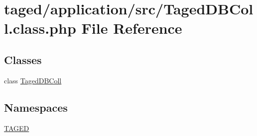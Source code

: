 \hypertarget{_taged_d_b_coll_8class_8php}{}\section{taged/application/src/\+Taged\+D\+B\+Coll.class.\+php File Reference}
\label{_taged_d_b_coll_8class_8php}
\subsection*{Classes}
\begin{DoxyCompactItemize}
\item 
class \hyperlink{class_taged_d_b_coll}{Taged\+D\+B\+Coll}
\end{DoxyCompactItemize}
\subsection*{Namespaces}
\begin{DoxyCompactItemize}
\item 
 \hyperlink{namespace_t_a_g_e_d}{T\+A\+G\+ED}
\end{DoxyCompactItemize}
